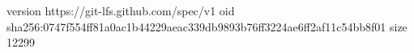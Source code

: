 version https://git-lfs.github.com/spec/v1
oid sha256:0747f554ff81a0ac1b44229aeac339db9893b76ff3224ae6ff2af11c54bb8f01
size 12299
